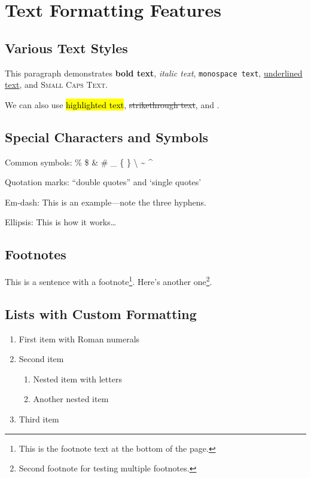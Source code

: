 \documentclass[11pt,a4paper]{article}
\theoremstyle{definition}
\begin{document}
\section{Text Formatting Features}

\subsection{Various Text Styles}

This paragraph demonstrates \textbf{bold text}, \textit{italic text}, \texttt{monospace text}, \underline{underlined text}, and \textsc{Small Caps Text}.

We can also use \hl{highlighted text}, \st{strikethrough text}, and .

\subsection{Special Characters and Symbols}

Common symbols: \% \$ \& \# \_ \{ \} \textbackslash{} \~{} \^{}

Quotation marks: ``double quotes'' and `single quotes'

Em-dash: This is an example---note the three hyphens.

Ellipsis: This is how it works\ldots

\subsection{Footnotes}

This is a sentence with a footnote\footnote{This is the footnote text at the bottom of the page.}. Here's another one\footnote{Second footnote for testing multiple footnotes.}.

\subsection{Lists with Custom Formatting}

\begin{enumerate}[label=(\Roman*)]
    \item First item with Roman numerals
    \item Second item
    \begin{enumerate}[label=(\alph*)]
        \item Nested item with letters
        \item Another nested item
    \end{enumerate}
    \item Third item
\end{enumerate}
\end{document}
